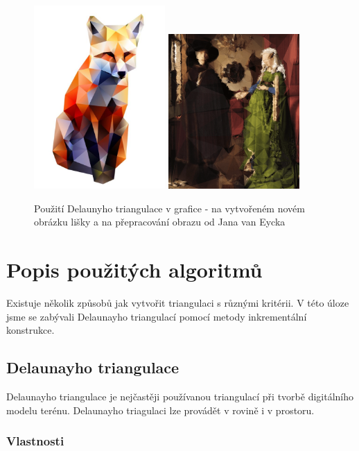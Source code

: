\documentclass[a4paper, 12pt]{article}
\begin{document}
\begin{figure}[h!]
\centering
\includegraphics[width=5cm]{pictures/liska.jpg}
\includegraphics[width=5cm]{pictures/jan_van_eyck.png}
\caption{Použití Delaunyho triangulace v grafice - na vytvořeném novém obrázku lišky a na přepracování obrazu od Jana van Eycka}
\end{figure}

\section{Popis použitých algoritmů}
Existuje několik způsobů jak vytvořit triangulaci s různými kritérii. V této úloze jsme se zabývali Delaunayho triangulací pomocí metody inkrementální konstrukce.

\subsection{Delaunayho triangulace}
Delaunayho triangulace je nejčastěji používanou triangulací při tvorbě digitálního modelu terénu. Delaunayho triagulaci lze provádět v rovině i v prostoru.
\\
\subsubsection{Vlastnosti}
\end{document}
